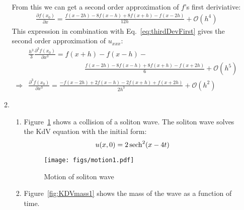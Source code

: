 \documentclass[12pt,a4]{article}
\begin{document}
\begin{enumerate}
\begin{enumerate}
\begin{align*}
        \end{align*}
        From this we can get a second order approximation of $f$'s first deriviative:
        \begin{align*}
          \frac{\partial f(x_0)}{\partial x} = \frac{f(x - 2 h)- 8 f(x - h) + 8 f(x + h) - f(x - 2 h)}{12 h} + \mathscr{O}(h^4) %
        \end{align*}
        This expression in combination with Eq.~\ref{eq:thirdDevFirst} gives the second order approximation of $u_{xxx}$:
        \begin{align*}
                      & \frac{h^3}{3} \frac{\partial^3 f(x_0)}{\partial x^3} = f(x + h) - f(x - h) - \\
                      & \qquad \qquad \qquad \qquad \frac{f(x - 2 h)- 8 f(x - h) + 8 f(x + h) - f(x + 2 h)}{6} + \mathscr{O}(h^5)\\ %
          \Rightarrow & \frac{\partial^3 f(x_0)}{\partial x^3} = \frac{- f(x - 2 h) + 2 f(x - h) - 2 f(x + h) + f(x +  2 h)}{2 h^3} + \mathscr{O}(h^2) %
        \end{align*}
      \item
        \begin{enumerate}
          \item
            Figure~\ref{fig:motion1} shows a collision of a soliton wave.
            The soliton wave solves the KdV equation with the initial form:
            \begin{equation*}
              u(x, 0) = 2 \sech ^ 2 (x - 4t)
            \end{equation*}
            \begin{figure}[H]
              \centering
              \texttt{[image: figs/motion1.pdf]}
              \caption{Motion of soliton wave}
              \label{fig:motion1}
            \end{figure}
          \item
            Figure~\ref{fig:KDVmass1} shows the mass of the wave as a function of time.

\end{enumerate}
\end{enumerate}
\end{enumerate}
\end{document}
